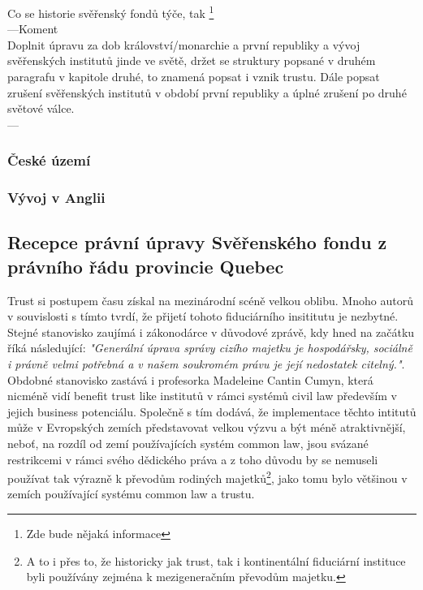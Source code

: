\documentclass{article}
\begin{document}

Co se historie svěřenský fondů týče, tak \footnote[4]{Zde bude nějaká informace}\\
---Koment\\
Doplnit úpravu za dob království/monarchie a první republiky a vývoj svěřenských institutů jinde ve světě, držet se struktury popsané v druhém paragrafu v kapitole druhé, to znamená popsat i vznik trustu.
Dále popsat zrušení svěřenských institutů v období první republiky a úplné zrušení po druhé světové válce.\\
---\\

\subsubsection{České území}

\subsubsection{Vývoj v Anglii}
\subsection{Recepce právní úpravy Svěřenského fondu z právního řádu provincie Quebec}

Trust si postupem času získal na mezinárodní scéně velkou oblibu. Mnoho autorů v souvislosti s tímto tvrdí, že přijetí tohoto fiduciárního insititutu je nezbytné. Stejné stanovisko zaujímá i zákonodárce v důvodové zprávě, kdy hned na začátku říká následující: \textit{"Generální úprava správy cizího majetku je hospodářsky, sociálně i právně velmi potřebná a v našem soukromém právu je její nedostatek citelný."}.\\

Obdobné stanovisko zastává i profesorka Madeleine Cantin Cumyn, která nicméně vidí benefit trust like institutů v rámci systémů civil law především v jejich business potenciálu. Společně s tím dodává, že implementace těchto intitutů může v Evropských zemích představovat velkou výzvu a být méně atraktivnější, neboť, na rozdíl od zemí používajících systém common law, jsou svázané restrikcemi v rámci svého dědického práva a z toho důvodu by se nemuseli používat tak výrazně k převodům rodiných majetků\footnote{A to i přes to, že historicky jak trust, tak i kontinentální fiduciární instituce byli používány zejména k mezigeneračním převodům majetku.}, jako tomu bylo většinou v zemích používající systému common law a trustu.\\
\end{document}

